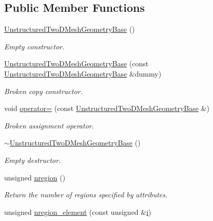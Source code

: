 \subsection*{Public Member Functions}
\begin{DoxyCompactItemize}
\item 
\hyperlink{classoomph_1_1UnstructuredTwoDMeshGeometryBase_aedeab24841b52a4b1f11e01c7c254bd1}{Unstructured\+Two\+D\+Mesh\+Geometry\+Base} ()
\begin{DoxyCompactList}\small\item\em Empty constructor. \end{DoxyCompactList}\item 
\hyperlink{classoomph_1_1UnstructuredTwoDMeshGeometryBase_a39637a4295ad41082d7c87c733448fff}{Unstructured\+Two\+D\+Mesh\+Geometry\+Base} (const \hyperlink{classoomph_1_1UnstructuredTwoDMeshGeometryBase}{Unstructured\+Two\+D\+Mesh\+Geometry\+Base} \&dummy)
\begin{DoxyCompactList}\small\item\em Broken copy constructor. \end{DoxyCompactList}\item 
void \hyperlink{classoomph_1_1UnstructuredTwoDMeshGeometryBase_a8ca153f1dfa57edf9931d4cc4c5ef9b6}{operator=} (const \hyperlink{classoomph_1_1UnstructuredTwoDMeshGeometryBase}{Unstructured\+Two\+D\+Mesh\+Geometry\+Base} \&)
\begin{DoxyCompactList}\small\item\em Broken assignment operator. \end{DoxyCompactList}\item 
\hyperlink{classoomph_1_1UnstructuredTwoDMeshGeometryBase_a68f77a0ca6fa3eba42b69770b06ef97a}{$\sim$\+Unstructured\+Two\+D\+Mesh\+Geometry\+Base} ()
\begin{DoxyCompactList}\small\item\em Empty destructor. \end{DoxyCompactList}\item 
unsigned \hyperlink{classoomph_1_1UnstructuredTwoDMeshGeometryBase_a9776e5d11ad42ce4d49750d31a87e1fc}{nregion} ()
\begin{DoxyCompactList}\small\item\em Return the number of regions specified by attributes. \end{DoxyCompactList}\item 
unsigned \hyperlink{classoomph_1_1UnstructuredTwoDMeshGeometryBase_aec1fffbd004b1dd32a04d2665b5ea455}{nregion\+\_\+element} (const unsigned \&\hyperlink{cfortran_8h_adb50e893b86b3e55e751a42eab3cba82}{i})

\end{DoxyCompactItemize}
